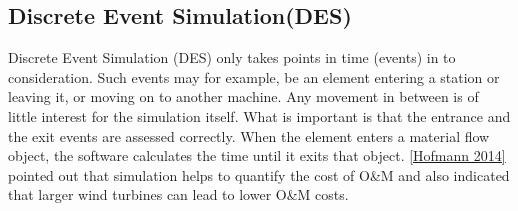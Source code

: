 \subsection{Discrete Event Simulation(DES)}
 Discrete Event Simulation (DES) only takes points in time (events) in to consideration. Such events may for example, be an element entering a station or leaving it, or moving on to another machine. Any movement in between is of little interest for the simulation itself. What is important is that the entrance and the exit events are assessed correctly. When the element enters a material flow object, the software calculates the time until it exits that object. \ref{Hofmann 2014} pointed out that simulation helps to quantify the cost of O&M and also indicated that larger wind turbines can lead to lower O&M costs. 
